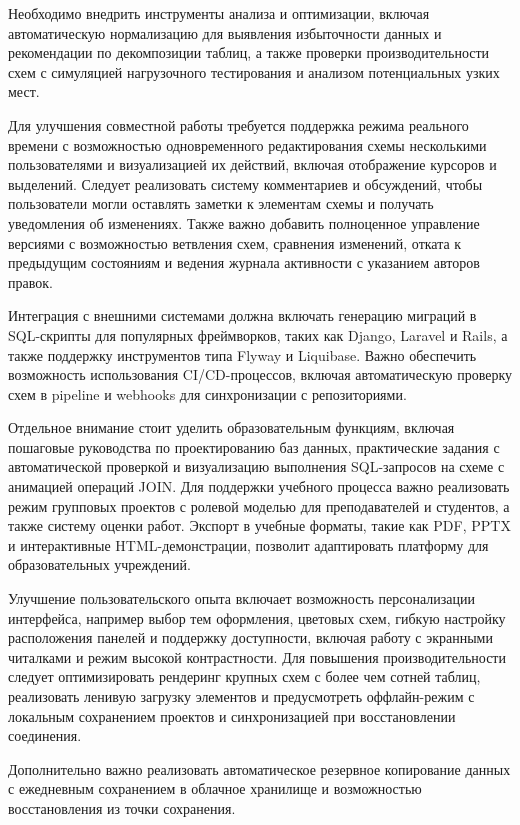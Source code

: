 Необходимо внедрить инструменты анализа и оптимизации, включая автоматическую нормализацию для выявления избыточности данных и рекомендации по декомпозиции таблиц, а также проверки производительности схем с симуляцией нагрузочного тестирования и анализом потенциальных узких мест.

Для улучшения совместной работы требуется поддержка режима реального времени с возможностью одновременного редактирования схемы несколькими пользователями и визуализацией их действий, включая отображение курсоров и выделений. Следует реализовать систему комментариев и обсуждений, чтобы пользователи могли оставлять заметки к элементам схемы и получать уведомления об изменениях. Также важно добавить полноценное управление версиями с возможностью ветвления схем, сравнения изменений, отката к предыдущим состояниям и ведения журнала активности с указанием авторов правок.

Интеграция с внешними системами должна включать генерацию миграций в SQL-скрипты для популярных фреймворков, таких как Django, Laravel и Rails, а также поддержку инструментов типа Flyway и Liquibase. Важно обеспечить возможность использования CI/CD-процессов, включая автоматическую проверку схем в pipeline и webhooks для синхронизации с репозиториями.

Отдельное внимание стоит уделить образовательным функциям, включая пошаговые руководства по проектированию баз данных, практические задания с автоматической проверкой и визуализацию выполнения SQL-запросов на схеме с анимацией операций JOIN. Для поддержки учебного процесса важно реализовать режим групповых проектов с ролевой моделью для преподавателей и студентов, а также систему оценки работ. Экспорт в учебные форматы, такие как PDF, PPTX и интерактивные HTML-демонстрации, позволит адаптировать платформу для образовательных учреждений.

Улучшение пользовательского опыта включает возможность персонализации интерфейса, например выбор тем оформления, цветовых схем, гибкую настройку расположения панелей и поддержку доступности, включая работу с экранными читалками и режим высокой контрастности. Для повышения производительности следует оптимизировать рендеринг крупных схем с более чем сотней таблиц, реализовать ленивую загрузку элементов и предусмотреть оффлайн-режим с локальным сохранением проектов и синхронизацией при восстановлении соединения.

Дополнительно важно реализовать автоматическое резервное копирование данных с ежедневным сохранением в облачное хранилище и возможностью восстановления из точки сохранения.

